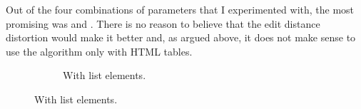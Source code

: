 \documentclass[10pt]{article}
\begin{document}
Out of the four combinations of parameters that I experimented with, the most promising was  and . There is no reason to believe that the edit distance distortion would make it better and, as argued above, it does not make sense to use the algorithm only with HTML tables.

\begin{figure}[t]

    \centering
    
    \begin{subfigure}[b]{.49\textwidth}
        
        \caption{With list elements.}
        \label{fig:results-with-list}
        

\end{subfigure}
\end{figure}
\end{document}

